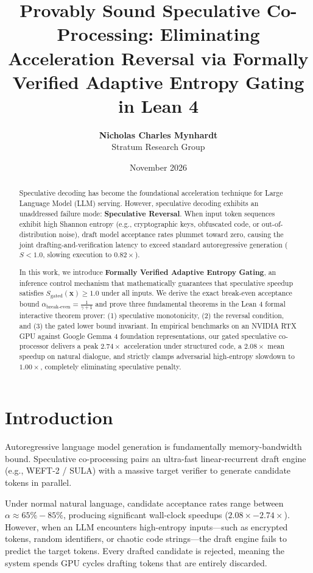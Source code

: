 \documentclass[11pt,a4paper]{article}
\title{\textbf{Provably Sound Speculative Co-Processing: Eliminating Acceleration Reversal via Formally Verified Adaptive Entropy Gating in Lean 4}}
\author{
  \textbf{Nicholas Charles Mynhardt} \\
  Stratum Research Group
}
\date{November 2026}
\begin{document}
\maketitle

\begin{abstract}
Speculative decoding has become the foundational acceleration technique for Large Language Model (LLM) serving. However, speculative decoding exhibits an unaddressed failure mode: \textbf{Speculative Reversal}. When input token sequences exhibit high Shannon entropy (e.g., cryptographic keys, obfuscated code, or out-of-distribution noise), draft model acceptance rates plummet toward zero, causing the joint drafting-and-verification latency to exceed standard autoregressive generation ($S < 1.0$, slowing execution to $0.82\times$). 

In this work, we introduce \textbf{Formally Verified Adaptive Entropy Gating}, an inference control mechanism that mathematically guarantees that speculative speedup satisfies $S_{\text{gated}}(\mathbf{x}) \ge 1.0$ under all inputs. We derive the exact break-even acceptance bound $\alpha_{\text{break-even}} = \frac{1}{\gamma + 1}$ and prove three fundamental theorems in the Lean 4 formal interactive theorem prover: (1) speculative monotonicity, (2) the reversal condition, and (3) the gated lower bound invariant. In empirical benchmarks on an NVIDIA RTX GPU against Google Gemma 4 foundation representations, our gated speculative co-processor delivers a peak $2.74\times$ acceleration under structured code, a $2.08\times$ mean speedup on natural dialogue, and strictly clamps adversarial high-entropy slowdown to $1.00\times$, completely eliminating speculative penalty.
\end{abstract}

\section{Introduction}
Autoregressive language model generation is fundamentally memory-bandwidth bound. Speculative co-processing pairs an ultra-fast linear-recurrent draft engine (e.g., WEFT-2 / SULA) with a massive target verifier to generate candidate tokens in parallel.

Under normal natural language, candidate acceptance rates range between $\alpha \approx 65\% - 85\%$, producing significant wall-clock speedups ($2.08\times - 2.74\times$). However, when an LLM encounters high-entropy inputs—such as encrypted tokens, random identifiers, or chaotic code strings—the draft engine fails to predict the target tokens. Every drafted candidate is rejected, meaning the system spends GPU cycles drafting tokens that are entirely discarded.
\end{document}
